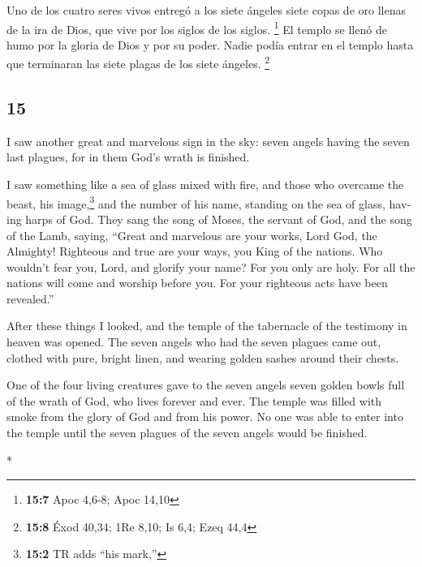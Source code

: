 \begin{paracol}{2}
 Uno de los cuatro seres vivos entregó a los siete ángeles
siete copas de oro llenas de la ira de Dios, que vive por los siglos de
los siglos. \footnote{\textbf{15:7} Apoc 4,6-8; Apoc 14,10}
 El templo se llenó de humo por la gloria de Dios y por su
poder. Nadie podía entrar en el templo hasta que terminaran las siete
plagas de los siete ángeles. \footnote{\textbf{15:8} Éxod 40,34; 1Re
  8,10; Is 6,4; Ezeq 44,4}

\switchcolumn
\begin{otherlanguage}{english}

\hypertarget{section-29}{%
\section{15}\label{section-29}}

 I saw another great and marvelous sign in the sky: seven
angels having the seven last plagues, for in them God's wrath is
finished.

 I saw something like a sea of glass mixed with fire, and
those who overcame the beast, his image,\footnote{\textbf{15:2} TR adds
  ``his mark,''} and the number of his name, standing on the sea of
glass, having harps of God.  They sang the song of Moses,
the servant of God, and the song of the Lamb, saying, ``Great and
marvelous are your works, Lord God, the Almighty! Righteous and true are
your ways, you King of the nations.  Who wouldn't fear
you, Lord, and glorify your name? For you only are holy. For all the
nations will come and worship before you. For your righteous acts have
been revealed.''

 After these things I looked, and the temple of the
tabernacle of the testimony in heaven was opened.  The
seven angels who had the seven plagues came out, clothed with pure,
bright linen, and wearing golden sashes around their chests.

 One of the four living creatures gave to the seven angels
seven golden bowls full of the wrath of God, who lives forever and ever.
 The temple was filled with smoke from the glory of God
and from his power. No one was able to enter into the temple until the
seven plagues of the seven angels would be finished.

\end{otherlanguage}

\switchcolumn[0]*

\hypertarget{el-derramamiento-de-los-siete-tazones-de-ira}{%
}
\end{paracol}
